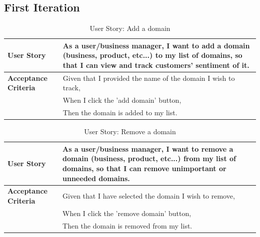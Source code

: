 \documentclass[12pt]{article}
\begin{document}
\subsection{First Iteration}
\begin{table}[htbp]
  \caption{User Story: Add a domain}
  \begin{tabular}{|p{}|p{}|}
    \hline
    \textbf{User Story}          & As a user/business manager, I want to add a domain (business, product, etc...) to my list of domains, so that I can view and track customers' sentiment of it. \\
    \hline
    \textbf{Acceptance Criteria} &
    Given that I provided the name of the domain I wish to track,                                                                                                                                 \\
                                 & When I click the 'add domain' button,                                                                                                                          \\
                                 & Then the domain is added to my list.                                                                                                                           \\
    \hline
  \end{tabular}
\end{table}

\begin{table}[htbp]
  \caption{User Story: Remove a domain}
  \begin{tabular}{|p{}|p{}|}
    \hline
    \textbf{User Story}          & As a user/business manager, I want to remove a domain (business, product, etc...) from my list of domains, so that I can remove unimportant or unneeded domains. \\
    \hline
    \textbf{Acceptance Criteria} &
    Given that I have selected the domain I wish to remove,                                                                                                                                         \\
                                 & When I click the 'remove domain' button,                                                                                                                         \\
                                 & Then the domain is removed from my list.                                                                                                                         \\
    \hline
  \end{tabular}
\end{table}
\end{document}
